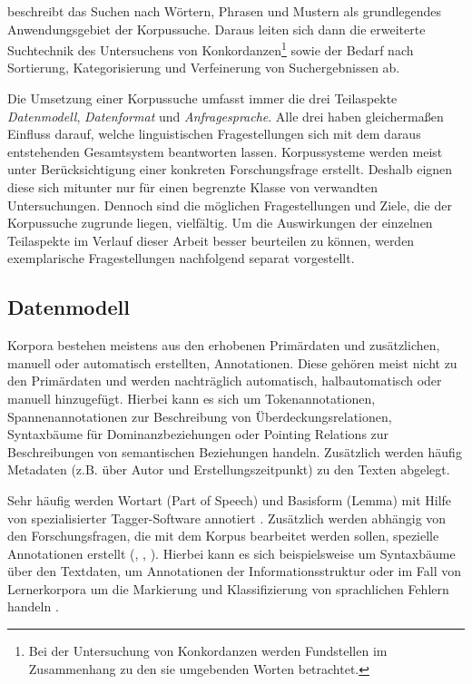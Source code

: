 \cite{wynneXXXXsearching} beschreibt das Suchen nach Wörtern, Phrasen und Mustern als grundlegendes Anwendungsgebiet der Korpussuche. Daraus leiten sich dann die erweiterte Suchtechnik des Untersuchens von Konkordanzen\footnote{Bei der Untersuchung von Konkordanzen werden Fundstellen im Zusammenhang zu den sie umgebenden Worten betrachtet.} sowie der Bedarf nach Sortierung, Kategorisierung und Verfeinerung von Suchergebnissen ab.

Die Umsetzung einer Korpussuche umfasst immer die drei Teilaspekte \emph{Datenmodell}, \emph{Datenformat} und \emph{Anfragesprache}. Alle drei haben gleichermaßen Einfluss darauf, welche linguistischen Fragestellungen sich mit dem daraus entstehenden Gesamtsystem beantworten lassen. Korpussysteme werden meist unter Berücksichtigung einer konkreten Forschungsfrage erstellt.
Deshalb eignen diese sich mitunter nur für einen begrenzte Klasse von verwandten Untersuchungen. Dennoch sind die möglichen Fragestellungen und Ziele, die der Korpussuche zugrunde liegen, vielfältig. Um die Auswirkungen der einzelnen Teilaspekte im Verlauf dieser Arbeit besser beurteilen zu können, werden exemplarische Fragestellungen nachfolgend separat vorgestellt.

\newpage
\subsection{Datenmodell}\label{sec:Korpussuche.Datenmodell}

Korpora bestehen meistens aus den erhobenen Primärdaten und zusätzlichen, manuell oder automatisch erstellten, Annotationen. Diese gehören meist nicht zu den Primärdaten und werden nachträglich automatisch, halbautomatisch oder manuell hinzugefügt. Hierbei kann es sich um Tokenannotationen, Spannenannotationen zur Beschreibung von Überdeckungsrelationen, Syntaxbäume für Dominanzbeziehungen oder Pointing Relations zur Beschreibungen von semantischen Beziehungen handeln. Zusätzlich werden häufig Metadaten (z.B. über Autor und Erstellungszeitpunkt) zu den Texten abgelegt.

Sehr häufig werden Wortart (Part of Speech) und Basisform (Lemma) mit Hilfe von spezialisierter Tagger-Software annotiert \citep[vgl.  z.B.][für die automatische Annotation von Wortarten]{schmidXXXXtagging}. Zusätzlich werden abhängig von den Forschungsfragen, die mit dem Korpus bearbeitet werden sollen, spezielle Annotationen erstellt (\citet[][]{carletta2005nite}, \citet[][]{woerner2006}, \citet[][]{chiarcosXXXXframework}). Hierbei kann es sich beispielsweise um Syntaxbäume über den Textdaten, um Annotationen der Informationsstruktur oder im Fall von Lernerkorpora um die Markierung und Klassifizierung von sprachlichen Fehlern handeln \citep[][]{luedeling2005lernercorpora}.

